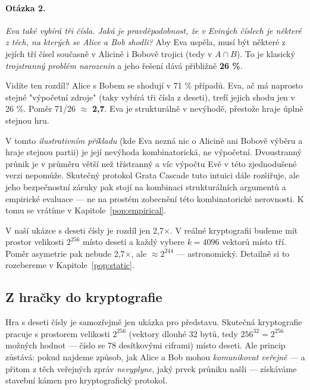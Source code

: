 \documentclass[11pt,a4paper]{article}
\begin{document}
\paragraph{Otázka 2.} \emph{Eva také vybírá tři čísla. Jaká je pravděpodobnost, že v Eviných číslech je některé z těch, na kterých se Alice a Bob shodli?} Aby Eva uspěla, musí být některé z jejích tří čísel současně v Alicině i Bobově trojici (tedy v $A \cap B$). To je klasický \emph{trojstranný problém narozenin} a jeho řešení dává přibližně \textbf{26 \%}.

Vidíte ten rozdíl? Alice s Bobem se shodují v 71 \% případů. Eva, ač má naprosto stejné "výpočetní zdroje" (taky vybírá tři čísla z deseti), trefí jejich shodu jen v 26 \%. Poměr 71/26 $\approx$ \textbf{2{,}7}. Eva je strukturálně v nevýhodě, přestože hraje úplně stejnou hru.

\begin{aha}
V tomto \emph{ilustrativním příkladu} (kde Eva nezná nic o Alicině ani Bobově výběru a hraje stejnou \mbox{} partii) je její nevýhoda kombinatorická, ne výpočetní. Dvoustranný průnik je v průměru větší než třístranný a víc výpočtu Evě v této zjednodušené verzi nepomůže. Skutečný protokol Grata Cascade tuto intuici dále rozšiřuje, ale jeho bezpečnostní záruky pak stojí na kombinaci strukturálních argumentů a empirické evaluace --- ne na prostém zobecnění této kombinatorické nerovnosti. K tomu se vrátíme v Kapitole~\ref{pop:empirical}.
\end{aha}

V naší ukázce s deseti čísly je rozdíl jen 2,7$\times$. V reálné kryptografii budeme mít prostor velikosti $2^{256}$ místo deseti a každý vybere $k = 4096$ vektorů místo tří. Poměr asymetrie pak nebude 2,7$\times$, ale $\approx 2^{244}$ --- astronomický. Detailně si to rozebereme v Kapitole~\ref{pop:static}.

\subsection{Z hračky do kryptografie}

Hra s deseti čísly je samozřejmě jen ukázka pro představu. Skutečná kryptografie pracuje s prostorem velikosti $2^{256}$ (vektory dlouhé 32 bytů, tedy $256^{32} = 2^{256}$ možných hodnot --- číslo se 78 desítkovými ciframi) místo deseti. Ale princip zůstává: pokud najdeme způsob, jak Alice a Bob mohou \emph{komunikovat veřejně} --- a přitom z těch veřejných zpráv \emph{nevyplyne}, jaký prvek průniku našli --- získáváme stavební kámen pro kryptografický protokol.
\end{document}
